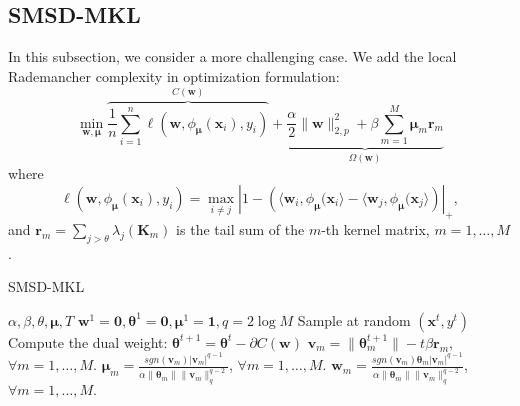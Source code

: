 \documentclass{article}
\begin{document}
\subsection{SMSD-MKL}
In this subsection, we consider a more challenging case.
We add the local Rademancher complexity in optimization formulation:
\begin{equation}
\label{optimization-problem}
    \min_{\pmb{w},\bm \mu}
    \overbrace{\frac{1}{n}\sum_{i=1}^n\ell(\pmb{w},\phi_{\bm \mu}(\mathbf{x}_i), y_i)}^{C(\pmb{w})}
    +\underbrace{\frac{\alpha}{2}\|\pmb{w}\|_{2,p}^2
    +\beta\sum_{m=1}^M\mathbf{\mu}_m\mathbf{r}_m}_{\Omega(\pmb{w})}
\end{equation}
where
$$\ell(\pmb{w},\phi_{\bm \mu}(\mathbf{x}_i), y_i)=
\max\limits_{i \not= j}\left|1-\left(\langle\pmb{w}_i, \phi_{\bm \mu}(\mathbf{x}_i\rangle -\langle\pmb{w}_j, \phi_{\bm \mu}(\mathbf{x}_j\rangle\right)\right|_+,$$
and
$\mathbf{r}_m=\sum_{j>\theta}\lambda_j(\mathbf{K}_m)$ is the tail sum of the $m$-th kernel matrix,  $m=1,\ldots, M$.

\begin{algorithm}[t]
   \caption{SMSD-MKL}
   \label{algorithm2}
    \begin{algorithmic}
        $\alpha, \beta, \theta, \mathbf{\mu}, T$
        $\pmb{w}^1=\mathbf{0}, \pmb{\theta}^1=\mathbf{0}, \mathbf{\mu}^1=\mathbf{1}, q=2\log M $
       \STATE Sample at random $(\mathbf{x}^t, y^t)$
       \STATE Compute the dual weight: $\pmb{\theta}^{t+1}=\pmb{\theta}^t-\partial{C(\pmb{w})}$
       \STATE $\pmb{v}_m=\|\pmb{\theta}_m^{t+1}\|-t\beta\mathbf{r}_m$, $\forall m=1,\ldots, M.$
       \STATE $\pmb{\mu}_m=\frac{sgn(\pmb{v}_m)|\pmb{v}_m|^{q-1}}
       {\alpha\|\pmb{\theta}_m\|\|\pmb{v}_m\|_q^{q-2}}$, $\forall m=1,\ldots, M.$
       \STATE $\pmb{w}_m=\frac{sgn(\pmb{v}_m)\pmb{\theta}_m|\pmb{v}_m|^{q-1}}
       {\alpha\|\pmb{\theta}_m\|\|\pmb{v}_m\|_q^{q-2}}$, $\forall m=1,\ldots, M.$
       \ENDFOR
    \end{algorithmic}
\end{algorithm}
\end{document}
